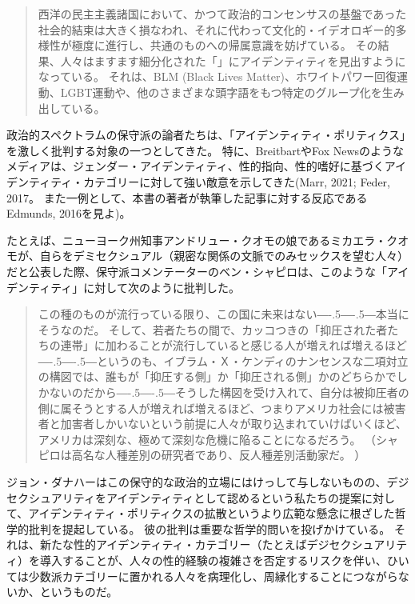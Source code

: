 \documentclass[paper=a4,book,openany]{jlreq}
\def\DDASH{―\kern-.5\zw―\kern-.5\zw―}
\begin{document}
\begin{quote}
西洋の民主主義諸国において、かつて政治的コンセンサスの基盤であった社会的結束は大きく損なわれ、それに代わって文化的・イデオロギー的多様性が極度に進行し、共通のものへの帰属意識を妨げている。
その結果、人々はますます細分化された「」にアイデンティティを見出すようになっている。
それは、BLM (Black Lives Matter)、ホワイトパワー回復運動、LGBT運動や、他のさまざまな頭字語をもつ特定のグループ化を生み出している。
\citep{gardels18:_franc_fukuy}
\end{quote}

政治的スペクトラムの保守派の論者たちは、「アイデンティティ・ポリティクス」を激しく批判する対象の一つとしてきた。
特に、BreitbartやFox Newsのようなメディアは、ジェンダー・アイデンティティ、性的指向、性的嗜好に基づくアイデンティティ・カテゴリーに対して強い敵意を示してきた(Marr, 2021; Feder, 2017。
また一例として、本書の著者が執筆した記事に対する反応であるEdmunds, 2016を見よ)。
\nocite{edmunds16:_eco_sexual_boast_mastur_water}
\nocite{marr21:_fox_news_has_consis_enabl,feder17:_steve_bannon_gay_agend}

たとえば、ニューヨーク州知事アンドリュー・クオモの娘であるミカエラ・クオモが、自らをデミセクシュアル（親密な関係の文脈でのみセックスを望む人々）だと公表した際、保守派コメンテーターのベン・シャピロは、このような「アイデンティティ」に対して次のように批判した。

\begin{quote}
この種のものが流行っている限り、この国に未来はない{\DDASH}本当にそうなのだ。
そして、若者たちの間で、カッコつきの「抑圧された者たちの連帯」に加わることが流行していると感じる人が増えれば増えるほど{\DDASH}というのも、イブラム・Ｘ・ケンディのナンセンスな二項対立の構図では、誰もが「抑圧する側」か「抑圧される側」かのどちらかでしかないのだから{\DDASH}そうした構図を受け入れて、自分は被抑圧者の側に属そうとする人が増えれば増えるほど、つまりアメリカ社会には被害者と加害者しかいないという前提に人々が取り込まれていけばいくほど、アメリカは深刻な、極めて深刻な危機に陥ることになるだろう。
\citep{shapiro21:_andrew_cuomos_daugh_comes_out_demis} （シャピロは高名な人種差別の研究者であり、反人種差別活動家だ。
）

\end{quote}

ジョン・ダナハーはこの保守的な政治的立場にはけっして与しないものの、デジセクシュアリティをアイデンティティとして認めるという私たちの提案に対して、アイデンティティ・ポリティクスの拡散というより広範な懸念に根ざした哲学的批判を提起している。
彼の批判は重要な哲学的問いを投げかけている。
それは、新たな性的アイデンティティ・カテゴリー（たとえばデジセクシュアリティ）を導入することが、人々の性的経験の複雑さを否定するリスクを伴い、ひいては少数派カテゴリーに置かれる人々を病理化し、周縁化することにつながらないか、というものだ。
\end{document}
